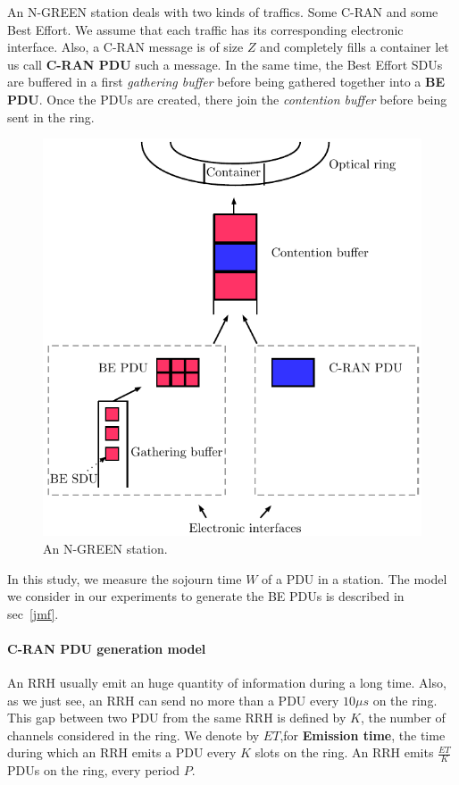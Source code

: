 \documentclass[a4paper,10pt,english]{article}
\begin{document}
  
      An N-GREEN station deals with two kinds of traffics. Some C-RAN and some Best Effort. We assume that each traffic has its corresponding electronic interface. Also, a C-RAN message is of size $Z $ and completely fills a container let us call {\bf C-RAN PDU} such a message. In the same time, the Best Effort SDUs are buffered in a first {\em gathering buffer} before being gathered together into a {\bf BE PDU}. Once the PDUs are created, there join the {\em contention buffer} before being sent in the ring.
      \begin{figure}[h!]
\begin{center}   
  \includegraphics[scale=0.7]{buffers.pdf}
     \caption{An N-GREEN station.}
     
\end{center}
  \end{figure}
  
 In this study, we measure the sojourn time $W$ of a PDU in a station. The model we consider in our experiments to generate the BE PDUs is described in sec~\ref{jmf}.
  
 \paragraph{C-RAN PDU generation model} An RRH usually emit an huge quantity of information during a long time. Also, as we just see, an RRH can send no more than a PDU every $10\mu s$ on the ring. This gap between two PDU from the same RRH is defined by $K$, the number of channels considered in the ring.
 We denote by $ET$,for {\bf Emission time}, the time during which an RRH emits a PDU every $K$ slots on the ring. An RRH emits $\frac{ET}{K}$ PDUs on the ring, every period $P$.
    	    
\end{document}
